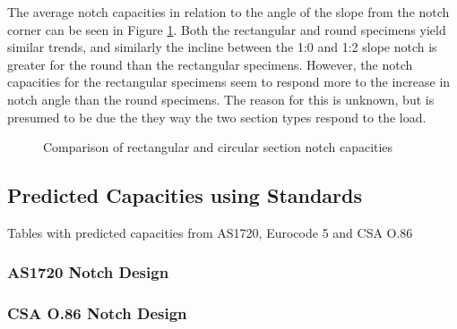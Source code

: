 \documentclass[11pt,a4paper]{article}
\numberwithin{equation}{subsection}
\begin{document}
\noindent
The average notch capacities in relation to the angle of the slope from the notch corner can be seen in Figure \ref{fig:compare_not}. Both the rectangular and round specimens yield similar trends, and similarly the incline between the 1:0 and 1:2 slope notch is greater for the round than the rectangular specimens. However, the notch capacities for the rectangular specimens seem to respond more to the increase in notch angle than the round specimens. The reason for this is unknown, but is presumed to be due the they way the two section types respond to the load.

\begin{figure}[h]
	\begin{center}
	\end{center}
	\caption{Comparison of rectangular and circular section notch capacities}
	\label{fig:compare_not}
\end{figure}

\subsection{Predicted Capacities using Standards}
\vspace*{\baselineskip}
\noindent Tables with predicted capacities from AS1720, Eurocode 5 and CSA O.86\par

\subsubsection{AS1720 Notch Design}


\subsubsection{CSA O.86 Notch Design}
\end{document}
